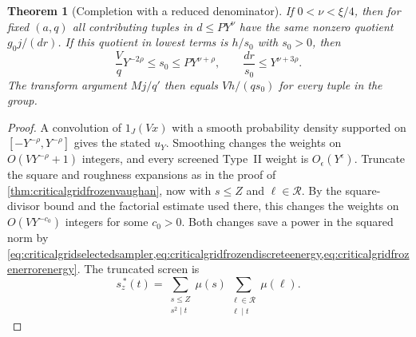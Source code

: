 \documentclass[11pt,a4paper]{article}
\numberwithin{equation}{section}
\newtheorem{theorem}{Theorem}[section]
\begin{document}
\begin{theorem}[Completion with a reduced denominator]
If $0<\nu<\xi/4$, then for fixed $(a,q)$ all contributing
tuples in $d\le P Y^\nu$ have the same nonzero quotient
$g_0j/(dr)$. If this quotient in lowest terms is $h/s_0$
with $s_0>0$, then
\begin{equation}
 \frac{V}{q}Y^{-2\rho}\le s_0\le P Y^{\nu+\rho},
 \qquad \frac{dr}{s_0}\le Y^{\nu+3\rho}.
 \label{eq:criticalgridpoissonratio}
\end{equation}
The transform argument $Mj/q'$ then equals $Vh/(q s_0)$
for every tuple in the group.
\end{theorem}

\begin{proof}
A convolution of $1_J(Vx)$ with a smooth probability
density supported on $[-Y^{-\rho},Y^{-\rho}]$ gives
the stated $u_Y$. Smoothing changes the weights on
$O(VY^{-\rho}+1)$ integers, and every screened Type~II
weight is $O_\epsilon(Y^\epsilon)$. Truncate the square
and roughness expansions as in the proof of
\cref{thm:criticalgridfrozenvaughan}, now with $s\le Z$
and $\ell\in\mathcal R$. By the square-divisor bound and
the factorial estimate used there, this changes the
weights on $O(VY^{-c_0})$ integers for some $c_0>0$.
Both changes save a power in the squared norm by
\cref{eq:criticalgridselectedsampler,eq:criticalgridfrozendiscreteenergy,eq:criticalgridfrozenerrorenergy}.
The truncated screen is
\[
 s_z^{\,*}(t)=
 \sum_{\substack{s\le Z\\s^2\mid t}}\mu(s)
 \sum_{\substack{\ell\in\mathcal R\\ \ell\mid t}}\mu(\ell).
\]


\end{proof}
\end{document}
